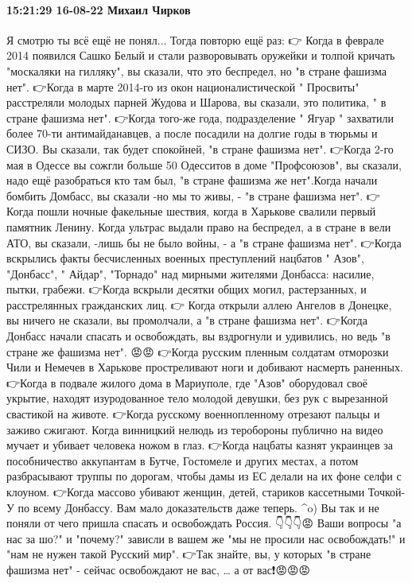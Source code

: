  
 
 
 
 

\paragraph{15:21:29 16-08-22 Михаил Чирков}

Я смотрю ты всё ещё не понял...
Тогда повторю ещё раз:
👉 Когда в феврале 2014 появился Сашко Белый и стали разворовывать оружейки и толпой кричать "москаляки на гилляку", вы сказали, что это беспредел, но "в стране фашизма нет".
👉Когда в марте 2014-го из окон националистической " Просвиты" расстреляли молодых парней Жудова и Шарова, вы сказали, это политика, " в стране фашизма нет".
👉Когда того-же года, подразделение " Ягуар " захватили более 70-ти антимайданавцев, а после посадили на долгие годы в тюрьмы и СИЗО. Вы сказали, так будет спокойней, "в стране фашизма нет".
👉Когда 2-го мая в Одессе вы сожгли больше 50 Одесситов в доме "Профсоюзов", вы сказали, надо ещё разобраться кто там был, "в стране фашизма же нет".Когда начали бомбить Домбасс, вы сказали -но мы то живы, - "в стране фашизма нет".
👉 Когда пошли ночные факельные шествия, когда в Харькове свалили первый памятник Ленину. Когда ультрас выдали право на беспредел, а в стране в вели АТО, вы сказали, -лишь бы не было войны, - а "в стране фашизма нет".
👉Когда вскрылись факты бесчисленных военных преступлений нацбатов " Азов", "Донбасс", " Айдар", "Торнадо" над мирными жителями Донбасса: насилие, пытки, грабежи. 👉Когда вскрыли десятки общих могил, растерзанных, и расстрелянных гражданских лиц.
👉 Когда открыли аллею Ангелов в Донецке, вы ничего не сказали, вы промолчали, а "в стране фашизма нет".
👉Когда Донбасс начали спасать и освобождать, вы вздрогнули и удивились, но ведь "в стране же фашизма нет".
😡😡
👉Когда русским пленным солдатам отморозки Чили и Немечев в Харькове простреливают ноги и добивают насмерть раненных.
👉Когда в подвале жилого дома в Мариуполе, где "Азов" оборудовал своё укрытие, находят изуродованное тело молодой девушки, без рук с вырезанной свастикой на животе.
👉Когда русскому военнопленному отрезают пальцы и заживо сжигают. Когда винницкий нелюдь из теробороны публично на видео мучает и убивает человека ножом в глаз.
👉Когда нацбаты казнят украинцев за пособничество аккупантам в Бутче, Гостомеле и других местах, а потом разбрасывают труппы по дорогам, чтобы дамы из ЕС делали на их фоне селфи с клоуном.
👉Когда массово убивают женщин, детей, стариков кассетными Точкой-У по всему Донбассу.
Вам мало доказательств даже теперь.
^o) Вы так и не поняли от чего пришла спасать и освобождать Россия.
👇👇👇😡
Ваши вопросы "а нас за шо?" и "почему?" зависли в вашем же "мы не просили нас освобождать!" и "нам не нужен такой Русский мир".
👉Так знайте, вы, у которых "в стране фашизма нет"
- сейчас освобождают не вас, … а от вас❗️😡😡😡

